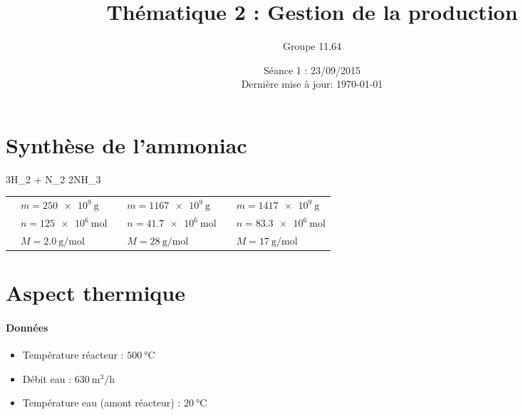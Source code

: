 \documentclass[a4paper,french]{article}
\title{Thématique 2 : Gestion de la production}
\author{Groupe 11.64}
\date{Séance 1 : 23/09/2015\\Dernière mise à jour: \today}
\begin{document}
	\maketitle	
	\section{Synthèse de l'ammoniac}
		\begin{chemmath}
			3H_2 + N_2 \longrightarrow 2NH_3	
		\end{chemmath}
		\begin{table}[h]
			\centering
			\renewcommand{\arraystretch}{2}
			\begin{tabular}{|cl|cl|cl|}\hline
				\chemform{3H_2} & $m = \SI{250e9}{\gram}$ & \chemform{N_2} & $m = \SI{1167e9}{\gram}$ & \chemform{2NH_3} & $m = \SI{1417e9}{\gram}$ \\
				& $n = \SI{125e6}{\mol}$ & & $n = \SI{41.7e6}{\mol}$ & & $n = \SI{83.3e6}{\mol}$ \\
				& $M = \SI{2.0}{\gram\per\mol}$ & & $M = \SI{28}{\gram\per\mol}$ & & $M = \SI{17}{\gram\per\mol}$ \\\hline
			\end{tabular}
		\end{table}
	\section{Aspect thermique}
		\paragraph*{Données}
			\begin{itemize}
				\item Température réacteur : $\SI{500}{\celsius}$
				\item Débit eau : $\SI{630}{\meter^3\per\hour}$
				\item Température eau (amont réacteur) : $\SI{20}{\celsius}$
			\end{itemize}	
\end{document}
